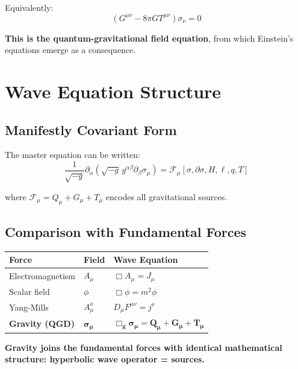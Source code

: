 \documentclass[11pt,a4paper]{article}
\theoremstyle{definition}
\theoremstyle{remark}
\begin{document}
		Equivalently:
		\begin{equation}
			(G^{\mu\nu} - 8\pi GT^{\mu\nu})\sigma_\nu = 0
		\end{equation}
		
		\textbf{This is the quantum-gravitational field equation}, from which Einstein's equations emerge as a consequence.
		
		\section{Wave Equation Structure}
		
		\subsection{Manifestly Covariant Form}
		
		The master equation can be written:
		\begin{equation}\label{eq:wave_form}
			\boxed{\frac{1}{\sqrt{-g}}\partial_\alpha\left(\sqrt{-g}\,g^{\alpha\beta}\partial_\beta\sigma_\mu\right) = \mathcal{F}_\mu[\sigma, \partial\sigma, H, \ell, q, T]}
		\end{equation}
		
		where $\mathcal{F}_\mu = Q_\mu + G_\mu + T_\mu$ encodes all gravitational sources.
		
		\subsection{Comparison with Fundamental Forces}
		
		\begin{center}
			\begin{tabular}{@{}lll@{}}
				\toprule
				\textbf{Force} & \textbf{Field} & \textbf{Wave Equation}\\
				\midrule
				Electromagnetism & $A_\mu$ & $\Box A_\mu = J_\mu$\\
				Scalar field & $\phi$ & $\Box\phi = m^2\phi$\\
				Yang-Mills & $A_\mu^a$ & $D_\mu F^{\mu\nu} = j^\nu$\\
				\textbf{Gravity (QGD)} & $\boldsymbol{\sigma_\mu}$ & $\boldsymbol{\Box_g\sigma_\mu = Q_\mu + G_\mu + T_\mu}$\\
				\bottomrule
			\end{tabular}
		\end{center}
		
		\textbf{Gravity joins the fundamental forces with identical mathematical structure: hyperbolic wave operator = sources.}
		
\end{document}
